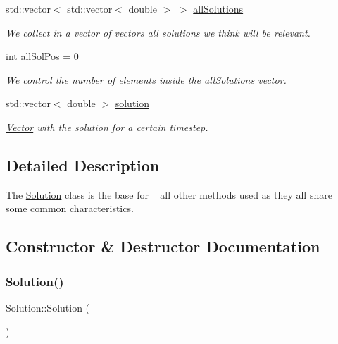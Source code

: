 \begin{DoxyCompactItemize}
\mbox{\label{class_solution_a09fa8d2538a87e8d9cba2ee682f729ac}} 
std\+::vector$<$ std\+::vector$<$ double $>$ $>$ \hyperlink{class_solution_a09fa8d2538a87e8d9cba2ee682f729ac}{all\+Solutions}
\begin{DoxyCompactList}\small\item\em We collect in a vector of vectors all solutions we think will be relevant. \end{DoxyCompactList}\item 
\mbox{\label{class_solution_af933662f6d08824b37f315fc36678c3b}} 
int \hyperlink{class_solution_af933662f6d08824b37f315fc36678c3b}{all\+Sol\+Pos} = 0
\begin{DoxyCompactList}\small\item\em We control the number of elements inside the all\+Solutions vector. \end{DoxyCompactList}\item 
\mbox{\label{class_solution_ae15c62e099b4ad8a337b62fd05283cd8}} 
std\+::vector$<$ double $>$ \hyperlink{class_solution_ae15c62e099b4ad8a337b62fd05283cd8}{solution}
\begin{DoxyCompactList}\small\item\em \hyperlink{class_vector}{Vector} with the solution for a certain timestep. \end{DoxyCompactList}\end{DoxyCompactItemize}


\subsection{Detailed Description}
The \hyperlink{class_solution}{Solution} class is the base for ~\newline
 all other methods used as they all share ~\newline
 some common characteristics. 

\subsection{Constructor \& Destructor Documentation}
\mbox{\label{class_solution_ab55bd4b023d596ce11aaf737b9a6123b}} 
\subsubsection{\texorpdfstring{Solution()}{Solution()}\hspace{0.1cm}{\footnotesize\ttfamily [1/2]}}
{\footnotesize\ttfamily Solution\+::\+Solution (\begin{DoxyParamCaption}{ }\end{DoxyParamCaption})}

